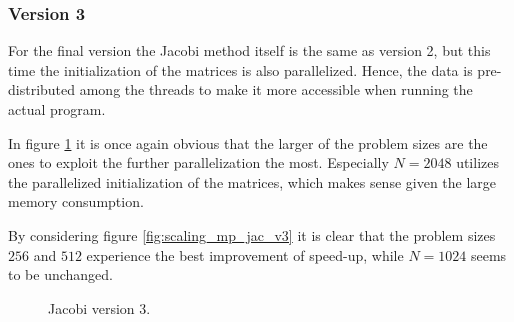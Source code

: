\subsubsection{Version 3}

For the final version the Jacobi method itself is the same as version 2, but this time the initialization of the matrices is also parallelized. Hence, the data is pre-distributed among the threads to make it more accessible when running the actual program. 

In figure \ref{fig:jac_comp_measure_v3} it is once again obvious that the larger of the problem sizes are the ones to exploit the further parallelization the most. Especially $N = 2048$ utilizes the parallelized initialization of the matrices, which makes sense given the large memory consumption.

By considering figure \ref{fig:scaling_mp_jac_v3} it is clear that the problem sizes $256$ and $512$ experience the best improvement of speed-up, while $N=1024$ seems to be unchanged.

\begin{figure}[H]
\centering
{}
\caption{Jacobi version 3.}
\label{fig:jac_comp_measure_v3}
\end{figure}



